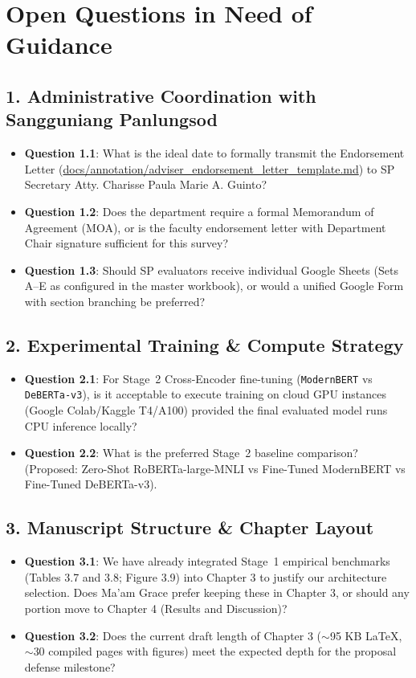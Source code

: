 \documentclass[10pt,letterpaper]{article}
\begin{document}
\section{Open Questions in Need of Guidance}

\subsection{1. Administrative Coordination with Sangguniang Panlungsod}
\begin{itemize}
    \item \textbf{Question 1.1}: What is the ideal date to formally transmit the Endorsement Letter (\url{docs/annotation/adviser_endorsement_letter_template.md}) to SP Secretary Atty. Charisse Paula Marie A. Guinto?
    \item \textbf{Question 1.2}: Does the department require a formal Memorandum of Agreement (MOA), or is the faculty endorsement letter with Department Chair signature sufficient for this survey?
    \item \textbf{Question 1.3}: Should SP evaluators receive individual Google Sheets (Sets A--E as configured in the master workbook), or would a unified Google Form with section branching be preferred?
\end{itemize}

\subsection{2. Experimental Training \& Compute Strategy}
\begin{itemize}
    \item \textbf{Question 2.1}: For Stage~2 Cross-Encoder fine-tuning (\texttt{ModernBERT} vs \texttt{DeBERTa-v3}), is it acceptable to execute training on cloud GPU instances (Google Colab/Kaggle T4/A100) provided the final evaluated model runs CPU inference locally?
    \item \textbf{Question 2.2}: What is the preferred Stage~2 baseline comparison? (Proposed: Zero-Shot RoBERTa-large-MNLI vs Fine-Tuned ModernBERT vs Fine-Tuned DeBERTa-v3).
\end{itemize}

\subsection{3. Manuscript Structure \& Chapter Layout}
\begin{itemize}
    \item \textbf{Question 3.1}: We have already integrated Stage~1 empirical benchmarks (Tables 3.7 and 3.8; Figure 3.9) into Chapter 3 to justify our architecture selection. Does Ma'am Grace prefer keeping these in Chapter 3, or should any portion move to Chapter 4 (Results and Discussion)?
    \item \textbf{Question 3.2}: Does the current draft length of Chapter 3 ($\sim$95 KB \LaTeX, $\sim$30 compiled pages with figures) meet the expected depth for the proposal defense milestone?
\end{itemize}
\end{document}
